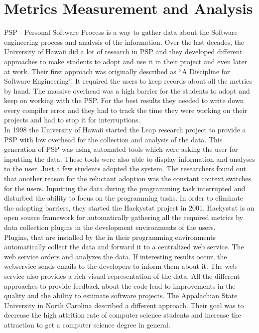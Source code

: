 \section{Metrics Measurement and Analysis}
PSP - Personal Software Process is a way to gather data about the Software engineering process and analysis of the information.
Over the last decades, the University of Hawaii did a lot of research in PSP and they developed different approaches to make students to adopt and use it in their project and even later at work.
Their first approach was originally described as ``A Discipline for Software Engineering''. It required the users to keep records about all the metrics by hand. The massive overhead was a high barrier for the students to adopt and keep on working with the PSP. For the best results they needed to write down every compiler error and they had to track the time they were working on their projects and had to stop it for interruptions.\\
In 1998 the University of Hawaii started the Leap research project to provide a PSP with low overhead for the collection and analysis of the data. This generation of PSP was using automated tools which were asking the user for inputting the data. These tools were also able to display information and analyses to the user.
Just a few students adopted the system. The researchers found out that another reason for the reluctant adoption was the constant context switches for the users. Inputting the data during the programming task interrupted and disturbed the ability to focus on the programming tasks. \cite{johnson2003beyond}
In order to eliminate the adopting barriers, they started the Hackystat project in 2001. Hackystat is an open source framework for automatically gathering all the required metrics by data collection plugins in the development environments of the users.\\
Plugins, that are installed by the in their programming environments automatically collect the data and forward it to a centralized web service. The web service orders and analyzes the data. If interesting results occur, the webservice sends emails to the developers to inform them about it. The web service also provides a rich visual representation of the data.
All the different approaches to provide feedback about the code lead to improvements in the quality and the ability to estimate software projects. \cite{johnson2001project} 
The Appalachian State University in North Carolina described a different approach. Their goal was to decrease the high attrition rate of computer science students and increase the attraction to get a computer science degree in general.\\
